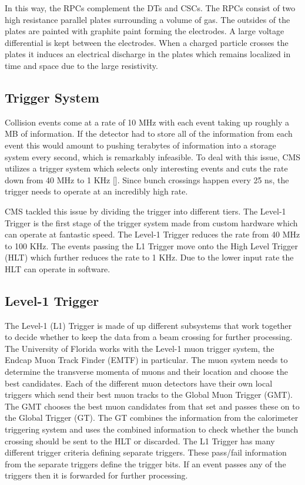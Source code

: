 In this way, the RPCs complement the DTs and CSCs. The RPCs consist of two high resistance parallel plates surrounding a volume of gas. The outsides of the plates are painted with graphite paint forming the electrodes. A large voltage differential is kept between the electrodes. When a charged particle crosses the plates it induces an electrical discharge in the plates which remains localized in time and space due to the large resistivity.

\subsection{Trigger System}
Collision events come at a rate of 10 MHz with each event taking up roughly a MB of information. If the detector had to store all of the information from each event this would amount to pushing terabytes of information into a storage system every second, which is remarkably infeasible. To deal with this issue, CMS utilizes a trigger system which selects only interesting events and cuts the rate down from 40 MHz to 1 KHz [\cite{cmsexp}]. Since bunch crossings happen every 25 ns, the trigger needs to operate at an incredibly high rate.

CMS tackled this issue by dividing the trigger into different tiers. The Level-1 Trigger is the first stage of the trigger system made from custom hardware which can operate at fantastic speed. The Level-1 Trigger reduces the rate from 40 MHz to 100 KHz. The events passing the L1 Trigger move onto the High Level Trigger (HLT) which further reduces the rate to 1 KHz. Due to the lower input rate the HLT can operate in software.

\subsection{Level-1 Trigger}

The Level-1 (L1) Trigger is made of up different subsystems that work together to decide whether to keep the data from a beam crossing for further processing. The University of Florida works with the Level-1 muon trigger system, the Endcap Muon Track Finder (EMTF) in particular. The muon system needs to determine the transverse momenta of muons and their location and choose the best candidates. Each of the different muon detectors have their own local triggers which send their best muon tracks to the Global Muon Trigger (GMT). The GMT chooses the best muon candidates from that set and passes these on to the Global Trigger (GT). The GT combines the information from the calorimeter triggering system and uses the combined information to check whether the bunch crossing should be sent to the HLT or discarded. The L1 Trigger has many different trigger criteria defining separate triggers. These pass/fail information from the separate triggers define the trigger bits. If an event passes any of the triggers then it is forwarded for further processing.

